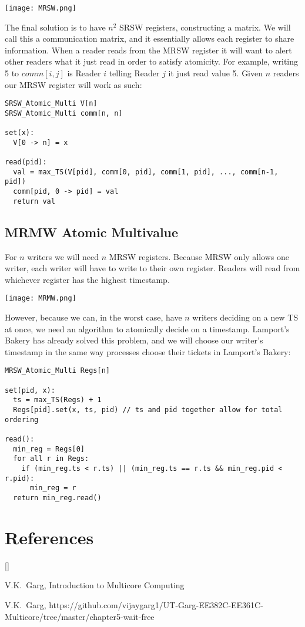 \documentclass[twoside]{article}
\def\beginrefs{\begin{list}%
        {[\arabic{equation}]}{\usecounter{equation}
         \setlength{\leftmargin}{2.0truecm}\setlength{\labelsep}{0.4truecm}%
         \setlength{\labelwidth}{1.6truecm}}}
\def\endrefs{\end{list}}
\def\bibentry#1{\item[\hbox{[#1]}]}
\begin{document}
\centerline{\texttt{[image: MRSW.png]}}

The final solution is to have $n^{2}$ SRSW registers, constructing a matrix. We will call this a communication matrix, and it essentially allows each register to share information. When a reader reads from the MRSW register it will want to alert other readers what it just read in order to satisfy atomicity. For example, writing 5 to $comm[i,j]$ is Reader $i$ telling Reader $j$ it just read value 5. Given $n$ readers our MRSW register will work as such:

\begin{verbatim}
SRSW_Atomic_Multi V[n]
SRSW_Atomic_Multi comm[n, n]

set(x):
  V[0 -> n] = x

read(pid):
  val = max_TS(V[pid], comm[0, pid], comm[1, pid], ..., comm[n-1, pid])
  comm[pid, 0 -> pid] = val
  return val
\end{verbatim}

\newpage

\subsection{MRMW Atomic Multivalue}

For $n$ writers we will need $n$ MRSW registers. Because MRSW only allows one writer, each writer will have to write to their own register. Readers will read from whichever register has the highest timestamp.

\centerline{\texttt{[image: MRMW.png]}}

However, because we can, in the worst case, have $n$ writers deciding on a new TS at once, we need an algorithm to atomically decide on a timestamp. Lamport's Bakery has already solved this problem, and we will choose our writer's timestamp in the same way processes choose their tickets in Lamport's Bakery:

\begin{verbatim}
MRSW_Atomic_Multi Regs[n]

set(pid, x):
  ts = max_TS(Regs) + 1
  Regs[pid].set(x, ts, pid) // ts and pid together allow for total ordering

read():
  min_reg = Regs[0]
  for all r in Regs:
    if (min_reg.ts < r.ts) || (min_reg.ts == r.ts && min_reg.pid < r.pid):
      min_reg = r
  return min_reg.read()
\end{verbatim}

\section*{References}
\beginrefs
\bibentry{1}{\sc V.K.~Garg}, Introduction to Multicore Computing
\bibentry{2}{\sc V.K.~Garg}, https://github.com/vijaygarg1/UT-Garg-EE382C-EE361C-Multicore/tree/master/chapter5-wait-free
\endrefs
\end{document}
